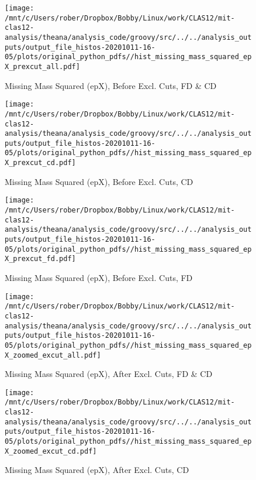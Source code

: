 \documentclass{article}
\begin{document}
\begin{landscape}
\begin{figure}[h]
        \texttt{[image: /mnt/c/Users/rober/Dropbox/Bobby/Linux/work/CLAS12/mit-clas12-analysis/theana/analysis\_code/groovy/src/../../analysis\_outputs/output\_file\_histos-20201011-16-05/plots/original\_python\_pdfs//hist\_missing\_mass\_squared\_epX\_prexcut\_all.pdf]}
        \captionsetup{textformat=empty,labelformat=blank}
        \caption{Missing Mass Squared (epX), Before Excl. Cuts, FD \& CD}
    \end{figure}
    \clearpage
    
    \begin{figure}[h]
        \centering

        \texttt{[image: /mnt/c/Users/rober/Dropbox/Bobby/Linux/work/CLAS12/mit-clas12-analysis/theana/analysis\_code/groovy/src/../../analysis\_outputs/output\_file\_histos-20201011-16-05/plots/original\_python\_pdfs//hist\_missing\_mass\_squared\_epX\_prexcut\_cd.pdf]}
        \captionsetup{textformat=empty,labelformat=blank}
        \caption{Missing Mass Squared (epX), Before Excl. Cuts, CD}
    \end{figure}
    \clearpage
    
    \begin{figure}[h]
        \centering

        \texttt{[image: /mnt/c/Users/rober/Dropbox/Bobby/Linux/work/CLAS12/mit-clas12-analysis/theana/analysis\_code/groovy/src/../../analysis\_outputs/output\_file\_histos-20201011-16-05/plots/original\_python\_pdfs//hist\_missing\_mass\_squared\_epX\_prexcut\_fd.pdf]}
        \captionsetup{textformat=empty,labelformat=blank}
        \caption{Missing Mass Squared (epX), Before Excl. Cuts, FD}
    \end{figure}
    \clearpage
    
    \begin{figure}[h]
        \centering

        \texttt{[image: /mnt/c/Users/rober/Dropbox/Bobby/Linux/work/CLAS12/mit-clas12-analysis/theana/analysis\_code/groovy/src/../../analysis\_outputs/output\_file\_histos-20201011-16-05/plots/original\_python\_pdfs//hist\_missing\_mass\_squared\_epX\_zoomed\_excut\_all.pdf]}
        \captionsetup{textformat=empty,labelformat=blank}
        \caption{Missing Mass Squared (epX), After Excl. Cuts, FD \& CD}
    \end{figure}
    \clearpage
    
    \begin{figure}[h]
        \centering

        \texttt{[image: /mnt/c/Users/rober/Dropbox/Bobby/Linux/work/CLAS12/mit-clas12-analysis/theana/analysis\_code/groovy/src/../../analysis\_outputs/output\_file\_histos-20201011-16-05/plots/original\_python\_pdfs//hist\_missing\_mass\_squared\_epX\_zoomed\_excut\_cd.pdf]}
        \captionsetup{textformat=empty,labelformat=blank}
        \caption{Missing Mass Squared (epX), After Excl. Cuts, CD}
    \end{figure}
    \clearpage
    

\end{landscape}
\end{document}
